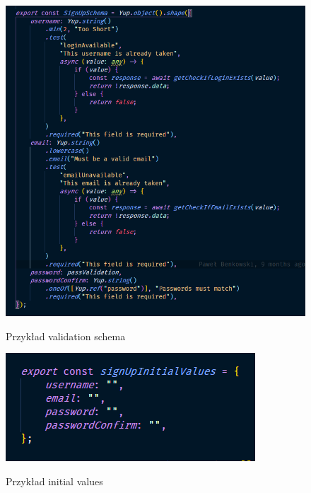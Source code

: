 \documentclass[a4paper,11pt]{report}
\begin{document}
\begin{figure}[H]
	\centering
	\includegraphics[scale=0.5]{implementacja/frontend/validation_schema}\\
	\caption{Przykład validation schema}
	\label{fig:validation_schema}
\end{figure}
\begin{figure}[H]
	\centering
	\includegraphics[scale=0.5]{implementacja/frontend/initial_values}\\
	\caption{Przykład initial values}
	\label{fig:initial_values}
\end{figure}
\end{document}
